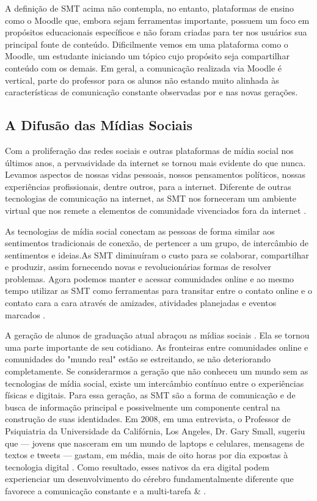 A definição de SMT acima não contempla, no entanto, plataformas de ensino como o
Moodle que, embora sejam ferramentas importante, possuem um foco em propósitos
educacionais específicos e não foram criadas para ter nos usuários sua principal
fonte de conteúdo. Dificilmente vemos em uma plataforma como o Moodle, um
estudante iniciando um tópico cujo propósito seja compartilhar conteúdo com
os demais. Em geral, a comunicação realizada via Moodle é vertical, parte do
professor para os alunos não estando muito alinhada às características de
comunicação constante observadas por \cite{prensky2001} e \cite{vorgan2009}
nas novas gerações.

\subsection{A Difusão das Mídias Sociais}

Com a proliferação das redes sociais e outras plataformas de mídia social nos
últimos anos, a pervasividade da internet se tornou mais evidente do que nunca.
Levamos aspectos de nossas vidas pessoais, nossos pensamentos políticos, nossas
experiências profissionais, dentre outros, para a internet. Diferente de outras
tecnologias de comunicação na internet, as SMT nos forneceram um ambiente
virtual que nos remete a elementos de comunidade vivenciados fora da internet
\cite{davis2012}.

As tecnologias de mídia social conectam as pessoas de forma similar aos sentimentos
tradicionais de conexão, de pertencer a um grupo, de intercâmbio de sentimentos
e ideias.As SMT diminuíram o custo para se colaborar, compartilhar e produzir,
assim fornecendo novas e revolucionárias formas de resolver problemas. Agora
podemos manter e acessar comunidades online e ao mesmo tempo utilizar as SMT
como ferramentas para transitar entre o contato online e o contato cara a cara
através de amizades, atividades planejadas e eventos marcados \cite{shirky2010}.

A geração de alunos de graduação atual abraçou as mídias sociais . Ela se tornou
uma parte importante de seu cotidiano. As fronteiras entre comunidades online e
comunidades do "mundo real" estão se estreitando, se não deteriorando
completamente. Se considerarmos a geração que não conheceu um mundo sem as
tecnologias de mídia social, existe um intercâmbio contínuo entre o experiências
físicas e digitais. Para essa geração, as SMT são a forma de comunicação e de
busca de informação principal e possivelmente um componente central na construção
de suas identidades.
Em 2008, em uma entrevista, o Professor de Psiquiatria da Universidade da Califórnia,
Los Angeles, Dr. Gary Small, sugeriu que — jovens que nasceram em um mundo de laptops
e celulares, mensagens de textos e tweets — gastam, em média, mais de oito horas
por dia expostas à tecnologia digital \cite{lin2008}. 
%
Como resultado, esses nativos da era digital podem experienciar um
desenvolvimento do cérebro fundamentalmente diferente que favorece a comunicação
constante e a multi-tarefa \cite{prensky2001} \& \cite{vorgan2009}.

